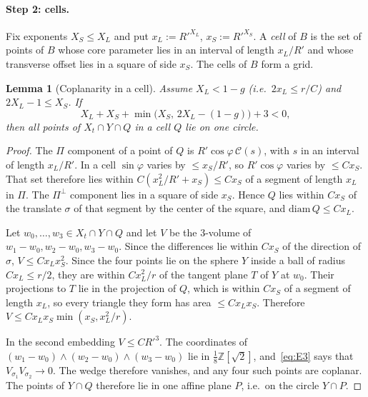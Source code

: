 \documentclass[aps,prx,twocolumn,superscriptaddress,nofootinbib,longbibliography]{revtex4-2}
\theoremstyle{plain}
\newtheorem{lemma}{Lemma}
\theoremstyle{definition}
\theoremstyle{remark}
\newcommand{\Z}{\mathbb{Z}}
\begin{document}
\paragraph{Step 2: cells.} Fix exponents $X_S\le X_L$ and put $x_L:=R'^{X_L}$, $x_S:=R'^{X_S}$. A \emph{cell} of $B$ is the set of points of $B$ whose core parameter lies in an interval of length $x_L/R'$ and whose transverse offset lies in a square of side $x_S$. The cells of $B$ form a grid.

\begin{lemma}[Coplanarity in a cell]\label{lem:E3}
Assume $X_L<1-g$ (i.e.\ $2x_L\le r/C$) and $2X_L-1\le X_S$. If
\begin{equation}\label{eq:E3}
X_L+X_S+\min\big(X_S,\,2X_L-(1-g)\big)+3<0,
\end{equation}
then all points of $X_t\cap Y\cap Q$ in a cell $Q$ lie on one circle.
\end{lemma}
\begin{proof}
The $\Pi$ component of a point of $Q$ is $R'\cos\varphi\,\mathcal C(s)$, with $s$ in an interval of length $x_L/R'$. In a cell $\sin\varphi$ varies by $\le x_S/R'$, so $R'\cos\varphi$ varies by $\le Cx_S$. That set therefore lies within $C(x_L^2/R'+x_S)\le Cx_S$ of a segment of length $x_L$ in $\Pi$. The $\Pi^\perp$ component lies in a square of side $x_S$. Hence $Q$ lies within $Cx_S$ of the translate $\sigma$ of that segment by the center of the square, and $\mathrm{diam}\,Q\le Cx_L$.

Let $w_0,\dots,w_3\in X_t\cap Y\cap Q$ and let $V$ be the $3$-volume of $w_1-w_0,w_2-w_0,w_3-w_0$. Since the differences lie within $Cx_S$ of the direction of $\sigma$, $V\le Cx_Lx_S^2$. Since the four points lie on the sphere $Y$ inside a ball of radius $Cx_L\le r/2$, they are within $Cx_L^2/r$ of the tangent plane $T$ of $Y$ at $w_0$. Their projections to $T$ lie in the projection of $Q$, which is within $Cx_S$ of a segment of length $x_L$, so every triangle they form has area $\le Cx_Lx_S$. Therefore $V\le Cx_Lx_S\min(x_S,x_L^2/r)$.

In the second embedding $V\le CR'^3$. The coordinates of $(w_1-w_0)\wedge(w_2-w_0)\wedge(w_3-w_0)$ lie in $\tfrac18\Z[\sqrt2]$, and~\eqref{eq:E3} says that $V_{\sigma_1}V_{\sigma_2}\to0$. The wedge therefore vanishes, and any four such points are coplanar. The points of $Y\cap Q$ therefore lie in one affine plane $P$, i.e.\ on the circle $Y\cap P$.
\end{proof}
\end{document}
